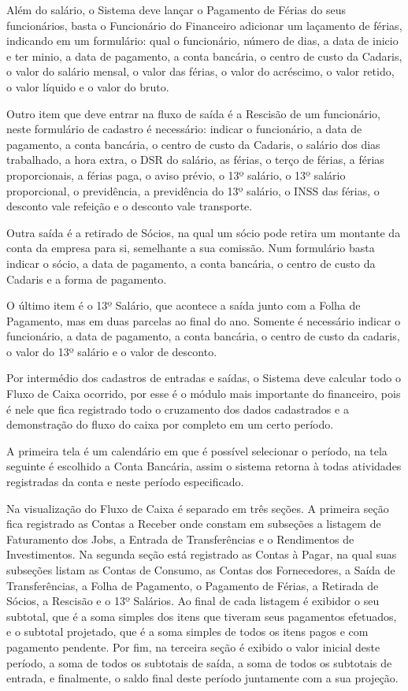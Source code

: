 \documentclass[
  12pt,            %
  openany,
  oneside,
  a4paper,         %
  english,      %
  brazil
]{article}
\numberwithin{figure}{section}
\numberwithin{table}{section}
\newcounter{subsubsubsection}[subsubsection]
\begin{document}
Além do salário, o Sistema deve lançar o Pagamento de Férias do seus funcionários, basta o Funcionário do Financeiro adicionar um laçamento de férias, indicando em um formulário: qual o funcionário, número de dias, a data de inicio e ter minio, a data de pagamento, a conta bancária, o centro de custo da Cadaris, o valor do salário mensal, o valor das férias, o valor do acréscimo, o valor retido, o valor líquido e o valor do bruto.

Outro item que deve entrar na fluxo de saída é a Rescisão de um funcionário, neste formulário de cadastro é necessário: indicar o funcionário, a data de pagamento, a conta bancária, o centro de custo da Cadaris, o salário dos dias trabalhado, a hora extra, o DSR do salário, as férias, o terço de férias, a férias proporcionais, a férias paga, o aviso prévio, o 13º salário, o 13º salário proporcional, o previdência, a previdência do 13º salário, o INSS das férias, o desconto vale refeição e o desconto vale transporte.

Outra saída é a retirado de Sócios, na qual um sócio pode retira um montante da conta da empresa para si, semelhante a sua comissão. Num formulário basta indicar o sócio, a data de pagamento, a conta bancária, o centro de custo da Cadaris e a forma de pagamento.

O último item é o 13º Salário, que acontece a saída junto com a Folha de Pagamento, mas em duas parcelas ao final do ano. Somente é necessário indicar o funcionário, a data de pagamento, a conta bancária, o centro de custo da cadaris, o valor do 13º salário e o valor de desconto.




Por intermédio dos cadastros de entradas e saídas, o Sistema deve calcular todo o Fluxo de Caixa ocorrido, por esse é o módulo mais importante do financeiro, pois é nele que fica registrado todo o cruzamento dos dados cadastrados e a demonstração do fluxo do caixa por completo em um certo período.

A primeira tela é um calendário em que é possível selecionar o período, na tela seguinte é escolhido a Conta Bancária, assim o sistema retorna à todas atividades registradas da conta e neste período especificado.

Na visualização do Fluxo de Caixa é separado em três seções. A primeira seção fica registrado as Contas a Receber onde constam em subseções a listagem de Faturamento dos Jobs, a Entrada de Transferências e o Rendimentos de Investimentos. Na segunda seção está registrado as Contas à Pagar, na qual suas subseções listam as Contas de Consumo, as Contas dos Fornecedores, a Saída de Transferências, a Folha de Pagamento, o Pagamento de Férias, a Retirada de Sócios, a Rescisão e o 13º Salários. Ao final de cada listagem é exibidor o seu subtotal, que é a soma simples dos itens que tiveram seus pagamentos efetuados, e o subtotal projetado, que é a soma simples de todos os itens pagos e com pagamento pendente. Por fim, na terceira seção é exibido o valor inicial deste período, a soma de todos os subtotais de saída, a soma de todos os subtotais de entrada, e finalmente, o saldo final deste período juntamente com a sua projeção.
\end{document}
